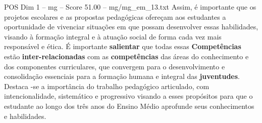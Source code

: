 \begin{textsample}{POS Dim 1 – mg – Score 51.00 – mg/mg\_em\_13.txt}
Assim, é importante que os projetos escolares e as propostas pedagógicas ofereçam aos estudantes a oportunidade de vivenciar situações em que possam desenvolver essas habilidades, visando à formação integral e à atuação social de forma cada vez mais responsável e ética.
É importante \textbf{salientar} que todas essas \textbf{Competências} estão \textbf{inter-relacionadas} com as \textbf{competências} das áreas do conhecimento e dos componentes curriculares, que convergem para o desenvolvimento e consolidação essenciais para a formação humana e integral das \textbf{juventudes}.
Destaca -se a importância do trabalho pedagógico articulado, com intencionalidade, sistemático e progressivo visando a esses propósitos para que o estudante ao longo dos três anos do Ensino Médio aprofunde seus conhecimentos e habilidades.

\end{textsample}
